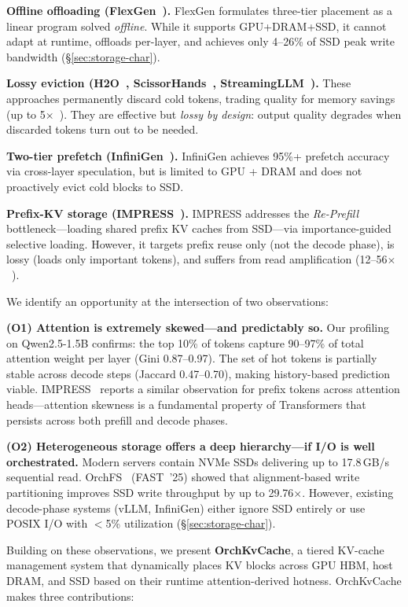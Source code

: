 \documentclass[conference]{IEEEtran}
\begin{document}
\textbf{Offline offloading (FlexGen~\cite{flexgen}).} FlexGen formulates three-tier placement as a linear program solved \emph{offline}. While it supports GPU+DRAM+SSD, it cannot adapt at runtime, offloads per-layer, and achieves only 4--26\% of SSD peak write bandwidth (\S\ref{sec:storage-char}).

\textbf{Lossy eviction (H2O~\cite{h2o}, ScissorHands~\cite{scissorhands}, StreamingLLM~\cite{streamingllm}).} These approaches permanently discard cold tokens, trading quality for memory savings (up to 5$\times$~\cite{h2o}).  They are effective but \emph{lossy by design}: output quality degrades when discarded tokens turn out to be needed.

\textbf{Two-tier prefetch (InfiniGen~\cite{infinigen}).} InfiniGen achieves 95\%+ prefetch accuracy via cross-layer speculation, but is limited to GPU + DRAM and does not proactively evict cold blocks to SSD.

\textbf{Prefix-KV storage (IMPRESS~\cite{impress}).} IMPRESS addresses the \emph{Re-Prefill} bottleneck---loading shared prefix KV caches from SSD---via importance-guided selective loading. However, it targets prefix reuse only (not the decode phase), is lossy (loads only important tokens), and suffers from read amplification (12--56$\times$~\cite{impress}).

We identify an opportunity at the intersection of two observations:

\textbf{(O1) Attention is extremely skewed---and predictably so.} Our profiling on Qwen2.5-1.5B confirms: the top 10\% of tokens capture 90--97\% of total attention weight per layer (Gini 0.87--0.97). The set of hot tokens is partially stable across decode steps (Jaccard 0.47--0.70), making history-based prediction viable. IMPRESS~\cite{impress} reports a similar observation for prefix tokens across attention heads---attention skewness is a fundamental property of Transformers that persists across both prefill and decode phases.

\textbf{(O2) Heterogeneous storage offers a deep hierarchy---if I/O is well orchestrated.} Modern servers contain NVMe SSDs delivering up to 17.8\,GB/s sequential read. OrchFS~\cite{orchfs} (FAST~'25) showed that alignment-based write partitioning improves SSD write throughput by up to 29.76$\times$. However, existing decode-phase systems (vLLM, InfiniGen) either ignore SSD entirely or use POSIX I/O with $<$5\% utilization (\S\ref{sec:storage-char}).

Building on these observations, we present \textbf{OrchKvCache}, a tiered KV-cache management system that dynamically places KV blocks across GPU HBM, host DRAM, and SSD based on their runtime attention-derived hotness. OrchKvCache makes three contributions:
\end{document}
